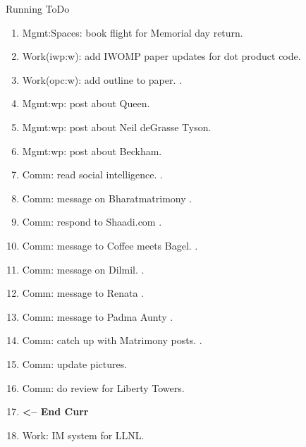 \begin{columns}
\begin{column}{0.6\linewidth}
\begin{block}{Running ToDo}
\begin{enumerate}
        \item \tiny Mgmt:Spaces: book flight for Memorial day return.

        \item \tiny Work(iwp:w): add IWOMP paper updates for dot product code. 
        \item \tiny Work(opc:w): add outline to paper. . 

        \item \tiny Mgmt:wp: post about Queen. 
        \item \tiny Mgmt:wp: post about Neil deGrasse Tyson. 
        \item \tiny Mgmt:wp: post about Beckham. 

        \item \tiny Comm: read social intelligence. . 

        \item \tiny Comm: message on Bharatmatrimony .           
        \item \tiny Comm: respond to Shaadi.com . 
        \item \tiny Comm: message to Coffee meets Bagel. . 
        \item \tiny Comm: message on Dilmil. .
        \item \tiny Comm: message to Renata .
        \item \tiny Comm: message to Padma Aunty .

        \item \tiny Comm: catch up with Matrimony posts. . 

        \item \tiny Comm: update pictures.  

        \item \tiny Comm: do review for Liberty Towers. 
        \item \tiny \textbf{ <-- End Curr } 
        \item \tiny Work: IM system for LLNL.
        \end{enumerate}
      \end{block}
 

\end{column}
\end{columns}
